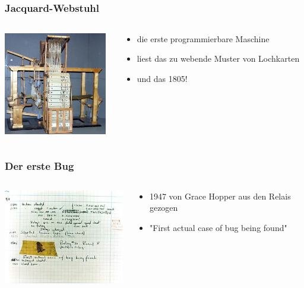 \documentclass{beamer}
\begin{document}
	\subsection{}
	\begin{frame}
		\frametitle{Jacquard-Webstuhl}
		\begin{columns}
			\begin{column}{5cm}
				\begin{overprint}
					\includegraphics[width=45mm]{./images/webstuhl.jpg}
				\end{overprint}
			\end{column}
			\begin{column}{5cm}
				\begin{itemize}
				\item die erste programmierbare Maschine
				\item liest das zu webende Muster von Lochkarten
				\item und das 1805!
				\end{itemize}
			\end{column}
		\end{columns}
	\end{frame}
	\begin{frame}
		\frametitle{Der erste Bug}
		\begin{columns}
			\begin{column}{5cm}
				\begin{overprint}
					\includegraphics{./images/bug.jpg}
				\end{overprint}
			\end{column}
			\begin{column}{5cm}
				\begin{itemize}
				\item 1947 von Grace Hopper aus den Relais gezogen
				\item "First actual case of bug being found"
				\end{itemize}
			\end{column}
		\end{columns}
	\end{frame}
\end{document}
